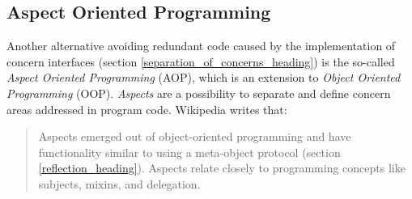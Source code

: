 %
%
%
%
%
%
%

\subsection{Aspect Oriented Programming}
\label{aspect_oriented_programming_heading}

Another alternative avoiding redundant code caused by the implementation of
concern interfaces (section \ref{separation_of_concerns_heading}) is the
so-called \emph{Aspect Oriented Programming} (AOP), which is an extension to
\emph{Object Oriented Programming} (OOP). \emph{Aspects} are a possibility to
separate and define concern areas addressed in program code. Wikipedia
\cite{wikipedia} writes that:

\begin{quote}
    Aspects emerged out of object-oriented programming and have functionality
    similar to using a meta-object protocol (section \ref{reflection_heading}).
    Aspects relate closely to programming concepts like subjects, mixins, and
    delegation.
\end{quote}

